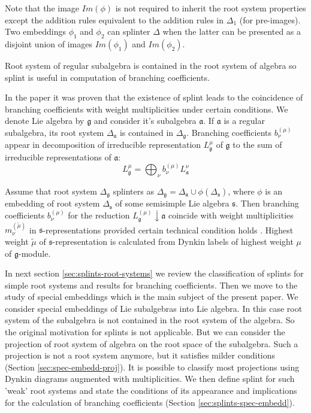 \documentclass{article}
\newcommand{\gf}{\mathfrak{g}}
\newcommand{\af}{\mathfrak{a}}
\newcommand{\sfr}{\mathfrak{s}}
\begin{document}
Note that the image $Im(\phi)$ is not required to inherit the root system
properties except the addition rules equivalent to the addition
rules in $\Delta_{1}$ (for pre-images). Two embeddings $\phi_1$ and $\phi_2$  
can splinter $\Delta$  when the latter can be presented 
as a disjoint union of images $Im(\phi_1)$ and $Im(\phi_2)$. 

Root system of regular subalgebra is contained in the root system of algebra so splint is useful in
computation of branching coefficients. 

In the paper \cite{2011arXiv1111.6787L} it was proven that the existence of splint leads to the
coincidence of branching coefficients with weight multiplicities under certain conditions. We denote
Lie algebra by $\gf$ and consider it's subalgebra $\af$. If $\af$ is a regular subalgebra, its root
system $\Delta_{\af}$ is contained in $\Delta_{\gf}$. Branching coefficients $b^{(\mu)}_{\nu}$
appear in decomposition of irreducible representation $L^{\mu}_{\gf}$ of $\gf$ to the sum of
irreducible representations of $\af$:
\begin{equation}
  \label{eq:1}
  L^{\mu}_{\gf}=\bigoplus_{\nu} b^{(\mu)}_{\nu} L^{\nu}_{\af}
\end{equation}

Assume that root system $\Delta_{\gf}$ splinters as $\Delta_{\gf}=\Delta_{\af} \cup
\phi(\Delta_{\sfr})$, where $\phi$ is an embedding of root system $\Delta_{\sfr}$ of some semisimple
Lie algebra $\sfr$. Then branching coefficients $b^{(\mu)}_{\nu}$ for the reduction
$L^{(\mu)}_{\gf}\downarrow \af$ coincide with weight multiplicities $m^{(\tilde \mu)}_{\nu}$ in
$\sfr$-representations provided certain technical condition holds \cite{2011arXiv1111.6787L}.
Highest weight $\tilde\mu$ of $\sfr$-representation is calculated from Dynkin labels of highest
weight $\mu$ of $\gf$-module.


In next section \ref{sec:splints-root-systems} we review the classification of splints for simple
root systems and results for branching coefficients. Then we move to the study of special embeddings
which is the main subject of the present paper. We consider special embeddings of Lie subalgebras
into Lie algebra. In this case root system of the subalgebra is not contained in the root system of
the algebra. So the original motivation for splints is not applicable. But we can consider the
projection of root system of algebra on the root space of the subalgebra. Such a projection is not a
root system anymore, but it satisfies milder conditions (Section \ref{sec:spec-embedd-proj}). It is
possible to classify most projections using Dynkin diagrams augmented with multiplicities. We then
define splint for such 'weak' root systems and state the conditions of its appearance and
implications for the calculation of branching coefficients (Section \ref{sec:splints-spec-embedd}).
\end{document}

